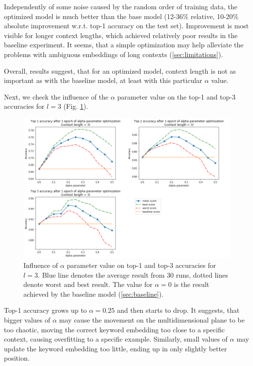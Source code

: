 \documentclass{llncs}
\begin{document}
Independently of some noise caused by the random order of training data, the optimized model is much better than the base model (12-36\% relative, 10-20\% absolute improvement w.r.t. top-1 accuracy on the test set).
Improvement is most visible for longer context lengths, which achieved relatively poor results in the baseline experiment.
It seems, that a simple optimization may help alleviate the problems with ambiguous embeddings of long contexts (\ref{sec:limitations}).

Overall, results suggest, that for an optimized model, context length is not as important as with the baseline model, at least with this particular \(\alpha\) value.

\bigskip
Next, we check the influence of the \(\alpha\) parameter value on the top-1 and top-3 accuracies for \(l=3\) (Fig. \ref{fig:exp2_alpha}).

\begin{figure}
    \centering
    \caption{Influence of \(\alpha\) parameter value on top-1 and top-3 accuracies for \(l=3\). Blue line denotes the average result from 30 runs, dotted lines denote worst and best result. The value for \(\alpha=0\) is the result achieved by the baseline model (\ref{sec:baseline}).}
    \label{fig:exp2_alpha}
    \includegraphics[scale=0.7]{res/exp2_alpha_top_acc.png}
\end{figure}

Top-1 accuracy grows up to \(\alpha=0.25\) and then starts to drop.
It suggests, that bigger values of \(\alpha\) may cause the movement on the multidimensional plane to be too chaotic, moving the correct keyword embedding too close to a specific context, causing overfitting to a specific example.
Similarly, small values of \(\alpha\) may update the keyword embedding too little, ending up in only slightly better position.
\end{document}
